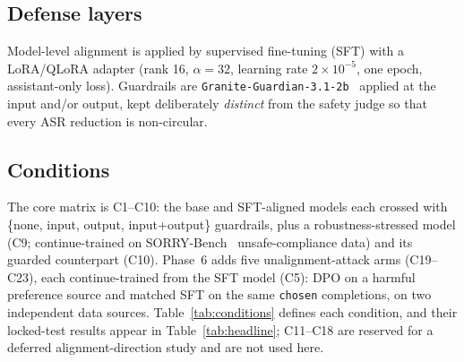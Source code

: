 \documentclass[11pt,a4paper]{article}
\newcommand{\code}[1]{\texttt{#1}}
\begin{document}
\subsection{Defense layers}
Model-level alignment is applied by supervised fine-tuning (SFT) with a LoRA/QLoRA adapter (rank 16, $\alpha=32$, learning rate
$2\times10^{-5}$, one epoch, assistant-only loss). Guardrails are
\code{Granite-Guardian-3.1-2b}~\cite{granite} applied at the input and/or output, kept deliberately
\emph{distinct} from the safety judge so that every ASR reduction is non-circular.

\subsection{Conditions}
The core matrix is C1--C10: the base and SFT-aligned models each crossed with
\{none, input, output, input+output\} guardrails, plus a robustness-stressed model (C9;
continue-trained on SORRY-Bench~\cite{sorrybench} unsafe-compliance data) and its guarded
counterpart (C10). Phase~6 adds five unalignment-attack arms (C19--C23), each
continue-trained from the SFT model (C5): DPO on a harmful preference source and matched SFT
on the same \code{chosen} completions, on two independent data sources. Table~\ref{tab:conditions}
defines each condition, and their locked-test results appear in Table~\ref{tab:headline};
C11--C18 are reserved for a deferred alignment-direction study and are not used here.
\end{document}
